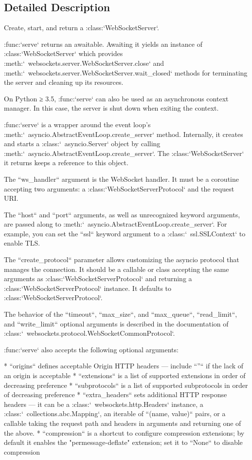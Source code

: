 \subsection{Detailed Description}
\begin{DoxyVerb}Create, start, and return a :class:`WebSocketServer`.

:func:`serve` returns an awaitable. Awaiting it yields an instance of
:class:`WebSocketServer` which provides
:meth:`~websockets.server.WebSocketServer.close` and
:meth:`~websockets.server.WebSocketServer.wait_closed` methods for
terminating the server and cleaning up its resources.

On Python ≥ 3.5, :func:`serve` can also be used as an asynchronous context
manager. In this case, the server is shut down when exiting the context.

:func:`serve` is a wrapper around the event loop's
:meth:`~asyncio.AbstractEventLoop.create_server` method. Internally, it
creates and starts a :class:`~asyncio.Server` object by calling
:meth:`~asyncio.AbstractEventLoop.create_server`. The
:class:`WebSocketServer` it returns keeps a reference to this object.

The ``ws_handler`` argument is the WebSocket handler. It must be a
coroutine accepting two arguments: a :class:`WebSocketServerProtocol` and
the request URI.

The ``host`` and ``port`` arguments, as well as unrecognized keyword
arguments, are passed along to
:meth:`~asyncio.AbstractEventLoop.create_server`. For example, you can set
the ``ssl`` keyword argument to a :class:`~ssl.SSLContext` to enable TLS.

The ``create_protocol`` parameter allows customizing the asyncio protocol
that manages the connection. It should be a callable or class accepting
the same arguments as :class:`WebSocketServerProtocol` and returning a
:class:`WebSocketServerProtocol` instance. It defaults to
:class:`WebSocketServerProtocol`.

The behavior of the ``timeout``, ``max_size``, and ``max_queue``,
``read_limit``, and ``write_limit`` optional arguments is described in the
documentation of :class:`~websockets.protocol.WebSocketCommonProtocol`.

:func:`serve` also accepts the following optional arguments:

* ``origins`` defines acceptable Origin HTTP headers — include ``''`` if
  the lack of an origin is acceptable
* ``extensions`` is a list of supported extensions in order of
  decreasing preference
* ``subprotocols`` is a list of supported subprotocols in order of
  decreasing preference
* ``extra_headers`` sets additional HTTP response headers — it can be a
  :class:`~websockets.http.Headers` instance, a
  :class:`~collections.abc.Mapping`, an iterable of ``(name, value)``
  pairs, or a callable taking the request path and headers in arguments
  and returning one of the above.
* ``compression`` is a shortcut to configure compression extensions;
  by default it enables the "permessage-deflate" extension; set it to
  ``None`` to disable compression


\end{DoxyVerb}
